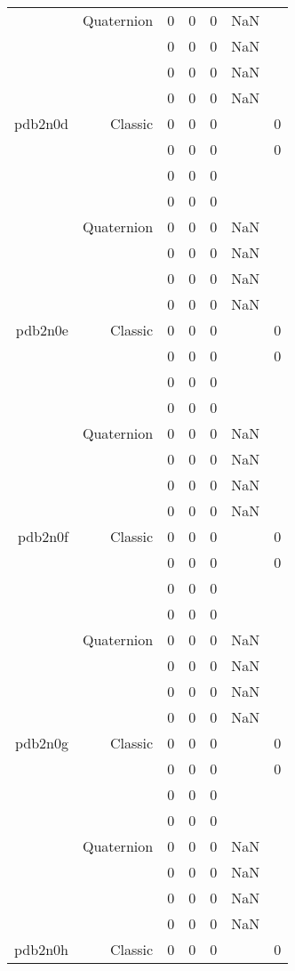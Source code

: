 \begin{xltabular}{\textwidth}{r|rcccSc}
& Quaternion & 0 & 0 & 0 & NaN & \\
& & 0 & 0 & 0 & NaN & \\
& & 0 & 0 & 0 & NaN & \\
& & 0 & 0 & 0 & NaN & \\ \addlinespace
pdb2n0d & Classic & 0 & 0 & 0 & & 0 \\
& & 0 & 0 & 0 & & 0 \\
& & 0 & 0 & 0 & & \\
& & 0 & 0 & 0 & & \\
& Quaternion & 0 & 0 & 0 & NaN & \\
& & 0 & 0 & 0 & NaN & \\
& & 0 & 0 & 0 & NaN & \\
& & 0 & 0 & 0 & NaN & \\ \addlinespace
pdb2n0e & Classic & 0 & 0 & 0 & & 0 \\
& & 0 & 0 & 0 & & 0 \\
& & 0 & 0 & 0 & & \\
& & 0 & 0 & 0 & & \\
& Quaternion & 0 & 0 & 0 & NaN & \\
& & 0 & 0 & 0 & NaN & \\
& & 0 & 0 & 0 & NaN & \\
& & 0 & 0 & 0 & NaN & \\ \addlinespace
pdb2n0f & Classic & 0 & 0 & 0 & & 0 \\
& & 0 & 0 & 0 & & 0 \\
& & 0 & 0 & 0 & & \\
& & 0 & 0 & 0 & & \\
& Quaternion & 0 & 0 & 0 & NaN & \\
& & 0 & 0 & 0 & NaN & \\
& & 0 & 0 & 0 & NaN & \\
& & 0 & 0 & 0 & NaN & \\ \addlinespace
pdb2n0g & Classic & 0 & 0 & 0 & & 0 \\
& & 0 & 0 & 0 & & 0 \\
& & 0 & 0 & 0 & & \\
& & 0 & 0 & 0 & & \\
& Quaternion & 0 & 0 & 0 & NaN & \\
& & 0 & 0 & 0 & NaN & \\
& & 0 & 0 & 0 & NaN & \\
& & 0 & 0 & 0 & NaN & \\ \addlinespace
pdb2n0h & Classic & 0 & 0 & 0 & & 0 \\

\end{xltabular}
